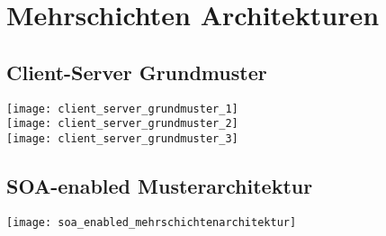 
\section{Mehrschichten Architekturen}
\subsection{Client-Server Grundmuster}
\texttt{[image: client\_server\_grundmuster\_1]}\\
\texttt{[image: client\_server\_grundmuster\_2]}\\
\texttt{[image: client\_server\_grundmuster\_3]}

\subsection{SOA-enabled Musterarchitektur}
\texttt{[image: soa\_enabled\_mehrschichtenarchitektur]}

